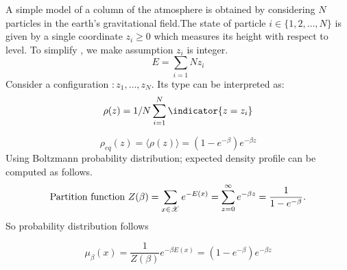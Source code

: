 \documentclass[letterpaper,english,10pt]{article}
\begin{document}
 \begin{exmp}
 
 A simple model of a column of the atmosphere is obtained by considering $N$ particles in the earth's gravitational field.The state of particle $i \in \lbrace 1,2, \dots, N \rbrace $ is given by a single coordinate $z_i\geq 0$ which measures its height with respect to level. To simplify , we make assumption $z_i$ is integer.
 \begin{equation}
     E=\sum_{i=1}{N}z_i
 \end{equation}
 Consider a configuration $:{z_1,\dots,z_N}$. Its type can be interpreted as:
 \begin{equation}
   \rho(z) = \displaystyle 1/N\sum_{i=1}^{N}\indicator{z=z_i}  
 \end{equation}
 
 \begin{equation}
     \rho_{eq}(z)=\langle \rho(z) \rangle = (1-e^{-\beta})e^{-\beta z}
 \end{equation}
 Using Boltzmann probability distribution; expected density profile can be computed as follows.
 \begin{equation}
 \text{Partition function   } \label{pf}
	Z(\beta)= \sum_{x \in \mathscr{X}}^{} e^{-E(x)}
 	=\sum_{z=0}^{\infty} e^{-\beta z} = \frac{1}{1-e^{-\beta}}. 
 \end{equation}
 So probability distribution follows
 
 \begin{equation}
 	\mu_{\beta}(x) = \frac{1}{Z(\beta)}e^{-\beta E(x)} = (1-e^{-\beta})e^{-\beta z}
 \end{equation}
 

\end{exmp}
\end{document}
